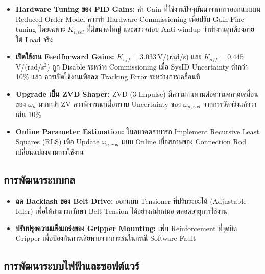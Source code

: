 \begin{itemize}
  \item \textbf{Hardware Tuning ของ PID Gains:}
        ค่า Gain ที่ใช้งานปัจจุบันมาจากการออกแบบบน Reduced-Order Model
        ควรทำ Hardware Commissioning เพื่อปรับ Gain Fine-tuning
        โดยเฉพาะ $K_{i,vel}$ ที่มีขนาดใหญ่
        และตรวจสอบ Anti-windup ว่าทำงานถูกต้องภายใต้ Load จริง

  \item \textbf{เปิดใช้งาน Feedforward Gains:}
        $K_{vff} = 3.033$\,V/(rad/s) และ $K_{aff} = 0.445$\,V/(rad/s$^2$)
        ถูก Disable ระหว่าง Commissioning
        เมื่อ SysID Uncertainty ต่ำกว่า 10\% แล้ว
        ควรเปิดใช้งานเพื่อลด Tracking Error ระหว่างการเคลื่อนที่

  \item \textbf{Upgrade เป็น ZVD Shaper:}
        ZVD (3-Impulse) มีความทนทานต่อความคลาดเคลื่อนของ $\omega_n$
        มากกว่า ZV ควรพิจารณาเมื่อทราบ Uncertainty ของ $\omega_{n,rod}$
        จากการวัดจริงแล้วว่าเกิน 10\%

  \item \textbf{Online Parameter Estimation:}
        ในอนาคตสามารถ Implement Recursive Least Squares (RLS)
        เพื่อ Update $\omega_{n,rod}$ แบบ Online
        เมื่อสภาพของ Connection Rod เปลี่ยนแปลงตามการใช้งาน
\end{itemize}

\subsection{การพัฒนาระบบกล}
\label{subsec:future_mech}

\begin{itemize}
  \item \textbf{ลด Backlash ของ Belt Drive:}
        ออกแบบ Tensioner ที่ปรับระยะได้ (Adjustable Idler)
        เพื่อให้สามารถรักษา Belt Tension ได้อย่างสม่ำเสมอ
        ตลอดอายุการใช้งาน

  \item \textbf{ปรับปรุงความแข็งแกร่งของ Gripper Mounting:}
        เพิ่ม Reinforcement ที่จุดยึด Gripper
        เพื่อป้องกันการเสียหายจากการชนในกรณี Software Fault
\end{itemize}

\subsection{การพัฒนาระบบไฟฟ้าและซอฟต์แวร์}
\label{subsec:future_elec_sw}

